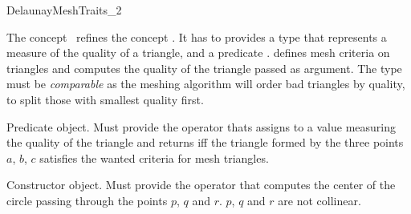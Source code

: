 \begin{ccRefConcept}{DelaunayMeshTraits_2}

\ccDefinition

The concept \ccRefName\ refines the concept
. It has to provides a
type  that represents a measure of the quality of a
triangle, and a predicate .   defines mesh
criteria on triangles and computes the quality of the triangle passed
as argument. The type  must be \emph{comparable} as the
meshing algorithm will order bad triangles by quality, to split those
with smallest quality first.

\ccRefines


\ccTypes


 {Predicate object. Must provide the operator
  thats assigns to  a value measuring the quality of the
  triangle and returns  iff the triangle formed by the three
  points $a$, $b$, $c$ satisfies the wanted criteria for mesh
  triangles.}

 {Constructor object. Must provide
  the operator 
  that computes the center of the circle passing through the points $p$,
  $q$ and $r$.
  \ccPrecond $p$, $q$ and $r$ are not collinear.}




\ccHasModels
{}\\

\end{ccRefConcept}

